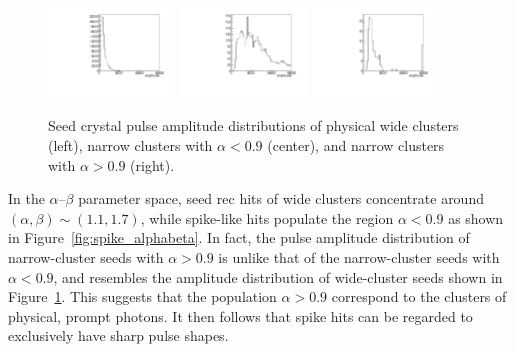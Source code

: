 \begin{figure}[tbp]
  \begin{center}
    \includegraphics[width=0.3\textwidth]{Reconstruction/Figures/spikes/physical_amplitude.pdf}
    \includegraphics[width=0.3\textwidth]{Reconstruction/Figures/spikes/spike_amplitude.pdf}
    \includegraphics[width=0.3\textwidth]{Reconstruction/Figures/spikes/narrow_largealpha_amplitude.pdf}
    \caption{
      Seed crystal pulse amplitude distributions of physical wide clusters (left), narrow clusters with $\alpha < 0.9$ (center), and narrow clusters with $\alpha > 0.9$ (right).
    }
    \label{fig:spike_amplitudes}
  \end{center}
\end{figure}

In the $\alpha$--$\beta$ parameter space, seed rec hits of wide clusters concentrate around $(\alpha, \beta) \sim (1.1, 1.7)$, while spike-like hits populate the region $\alpha < 0.9$ as shown in Figure~\ref{fig:spike_alphabeta}.
In fact, the pulse amplitude distribution of narrow-cluster seeds with $\alpha > 0.9$ is unlike that of the narrow-cluster seeds with $\alpha < 0.9$, and resembles the amplitude distribution of wide-cluster seeds shown in Figure~\ref{fig:spike_amplitudes}.
This suggests that the population $\alpha > 0.9$ correspond to the clusters of physical, prompt photons.
It then follows that spike hits can be regarded to exclusively have sharp pulse shapes.
